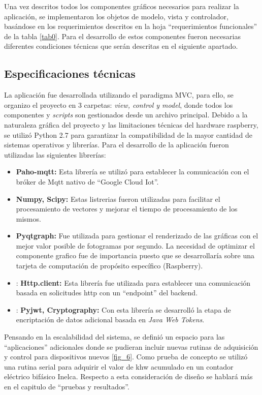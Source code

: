 
Una vez descritos todos los componentes gráficos necesarios para realizar la aplicación, se implementaron los objetos de modelo, vista y controlador, basándose en los requerimientos descritos en la hoja ``requerimientos funcionales'' de la tabla \ref{tab0}. Para el desarrollo de estos componentes fueron necesarias diferentes condiciones técnicas que serán descritas en el siguiente apartado.

\subsection{Especificaciones técnicas}

La aplicación fue desarrollada utilizando el paradigma MVC, para ello, se organizo el proyecto en 3 carpetas: \textit{view, control y model}, donde todos los componentes y \textit{scripts} son gestionados desde un archivo principal. Debido a la naturaleza gráfica del proyecto y las limitaciones técnicas del hardware raspberry, se utilizó Python 2.7 para garantizar la compatibilidad de la mayor cantidad de sistemas operativos y librerías. 
Para el desarrollo de la aplicación fueron utilizadas las siguientes librerías:

\begin{itemize}
	\item \textbf{Paho-mqtt:} Esta librería se utilizó para establecer la comunicación con el bróker de Mqtt nativo de “Google Cloud Iot”.
	\item \textbf{Numpy, Scipy:} Estas listrerias fueron utilizadas para facilitar el procesamiento de vectores y mejorar el tiempo de procesamiento de los mismos.
	\item \textbf{Pyqtgraph:} Fue utilizada para gestionar el renderizado de las gráficas con el mejor valor posible de fotogramas por segundo. La necesidad de optimizar el componente grafico fue de importancia puesto que se desarrollaría sobre una tarjeta de computación de propósito específico (Raspberry).
	\item: \textbf{Http.client:} Esta librería fue utilizada para establecer una comunicación basada en solicitudes http con un ``endpoint'' del backend.
	\item: \textbf{Pyjwt, Cryptography:} Con esta librería se desarrolló la etapa de encriptación de datos adicional basada en \textit{Java Web Tokens}.	
\end{itemize}


Pensando en la escalabilidad del sistema, se definió un espacio para las ``aplicaciones'' adicionales donde se pudieran incluir nuevas rutinas de adquisición y control para dispositivos nuevos \ref{fig_6}. Como prueba de concepto se utilizó una rutina serial para adquirir el valor de khw acumulado en un contador eléctrico bifásico Inelca. Respecto a esta consideración de diseño se hablará más en el capitulo de ``pruebas y resultados''.
\vspace{0.5cm}\\

